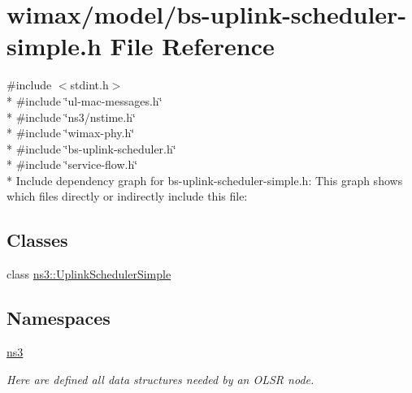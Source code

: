 \hypertarget{bs-uplink-scheduler-simple_8h}{}\section{wimax/model/bs-\/uplink-\/scheduler-\/simple.h File Reference}
\label{bs-uplink-scheduler-simple_8h}
{\ttfamily \#include $<$stdint.\+h$>$}\\*
{\ttfamily \#include \char`\"{}ul-\/mac-\/messages.\+h\char`\"{}}\\*
{\ttfamily \#include \char`\"{}ns3/nstime.\+h\char`\"{}}\\*
{\ttfamily \#include \char`\"{}wimax-\/phy.\+h\char`\"{}}\\*
{\ttfamily \#include \char`\"{}bs-\/uplink-\/scheduler.\+h\char`\"{}}\\*
{\ttfamily \#include \char`\"{}service-\/flow.\+h\char`\"{}}\\*
Include dependency graph for bs-\/uplink-\/scheduler-\/simple.h\+:
This graph shows which files directly or indirectly include this file\+:
\subsection*{Classes}
\begin{DoxyCompactItemize}
\item 
class \hyperlink{classns3_1_1UplinkSchedulerSimple}{ns3\+::\+Uplink\+Scheduler\+Simple}
\end{DoxyCompactItemize}
\subsection*{Namespaces}
\begin{DoxyCompactItemize}
\item 
 \hyperlink{namespacens3}{ns3}
\begin{DoxyCompactList}\small\item\em Here are defined all data structures needed by an O\+L\+SR node. \end{DoxyCompactList}\end{DoxyCompactItemize}
